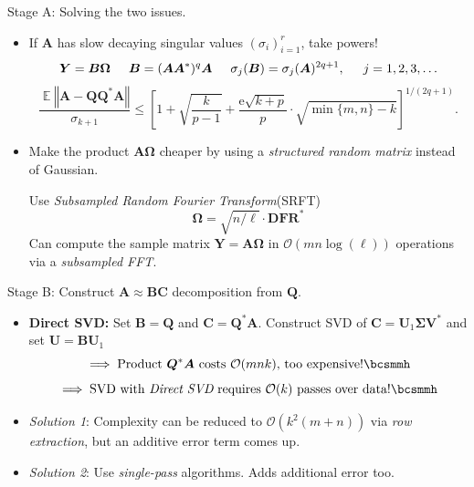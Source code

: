 \documentclass{beamer}
\newcommand{\Expect}{\operatorname{\mathbb{E}}}
\newcommand{\norm}[1]{\left\Vert {#1} \right\Vert}
\newcommand{\mtx}[1]{\bm{#1}}
\newcommand{\adj}{*}
\newcommand{\econst}{\mathrm{e}}
\begin{document}
\begin{frame}{Stage A: Solving the two issues.}
\begin{itemize}
  \item If $\mtx{A}$ has slow decaying singular values $(\sigma_i)_{i=1}^r$, take powers!\bcsmbh
  $$ \mtx{Y}=\mtx{B}\mtx{\Omega}\hspace{0.5cm}\mtx{B}=(\mtx{A}\mtx{A}^\adj)^q\mtx{A} \hspace{0.5cm} \sigma_j(\mtx{B}) = \sigma_j(\mtx{A})^{2q+1},
      \hspace{0.5cm} j=1,2,3,\ldots$$
      $$ \frac{\Expect \norm{\mtx{A}-\mtx{Q}\mtx{Q}^\adj\mtx{A}}}{\sigma_{k+1}}
    \leq \left[ 1 + \sqrt{\frac{k}{p-1}}
    + \frac{\econst\sqrt{k+p}}{p} \cdot \sqrt{ \min\{m,n\} - k } \right]^{1/(2q+1)}
    . $$

  \item Make the product $\mtx{A}\mtx{\Omega}$ cheaper by using a 
  \textit{structured random matrix} instead of Gaussian. 

  Use \textit{Subsampled Random Fourier Transform}(SRFT)
  $$ \mtx{\Omega} = \sqrt{n/\ell} \cdot \mtx{DFR}^\adj $$
  Can compute the sample
matrix $\mtx{Y} = \mtx{A\Omega}$ in $\mathcal{O}(mn\log(\ell))$ operations via a
\textit{subsampled FFT}. \bcsmbh
\end{itemize}
\end{frame}

\begin{frame}{Stage B: Construct $\mtx{A}\approx\mtx{B}\mtx{C}$ decomposition from $\mtx{Q}$.}
\begin{itemize}
  \item \textbf{Direct SVD:} Set $\mtx{B}=\mtx{Q}$ and $\mtx{C}=\mtx{Q}^\adj\mtx{A}$.
  Construct SVD of $\mtx{C}=\mtx{U}_1\mtx{\Sigma}\mtx{V}^\adj$ and set $\mtx{U}=\mtx{B}\mtx{U}_1$
  $$ \implies \text{Product }\mtx{Q}^\adj\mtx{A}\text{ costs }
  \mathcal{O}(mnk)\text{, too expensive!} \bcsmmh$$
  $$ \implies \text{SVD with } \textit{Direct SVD} 
  \text{ requires } \mathcal{O}(k)\text{ passes over data!} \bcsmmh$$

  \item \textit{Solution 1}: Complexity can be reduced to $\mathcal{O}(k^2(m+n))$
  via \textit{row extraction}, but an additive error term comes up. \bcsmbh

  \item \textit{Solution 2}: Use \textit{single-pass} algorithms.
  Adds additional error too. \bcsmbh
\end{itemize}
\end{frame}
\end{document}
